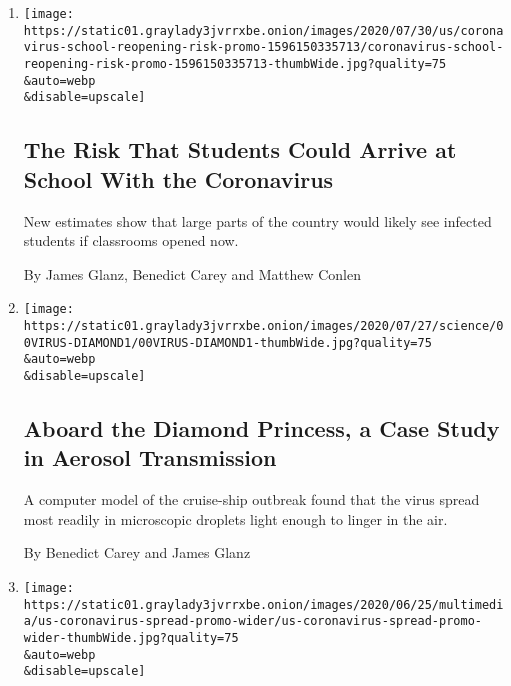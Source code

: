 \begin{enumerate}
\def\labelenumi{\arabic{enumi}.}
\item
  \href{/interactive/2020/07/31/us/coronavirus-school-reopening-risk.html}{}

  \texttt{[image: https://static01.graylady3jvrrxbe.onion/images/2020/07/30/us/coronavirus-school-reopening-risk-promo-1596150335713/coronavirus-school-reopening-risk-promo-1596150335713-thumbWide.jpg?quality=75\\\&auto=webp\\\&disable=upscale]}

  \hypertarget{the-risk-that-students-could-arrive-at-school-with-the-coronavirus}{%
  \subsection{The Risk That Students Could Arrive at School With the
  Coronavirus}\label{the-risk-that-students-could-arrive-at-school-with-the-coronavirus}}

  New estimates show that large parts of the country would likely see
  infected students if classrooms opened now.

  By James Glanz, Benedict Carey and Matthew Conlen
\item
  \href{/2020/07/30/health/diamond-princess-coronavirus-aerosol.html}{}

  \texttt{[image: https://static01.graylady3jvrrxbe.onion/images/2020/07/27/science/00VIRUS-DIAMOND1/00VIRUS-DIAMOND1-thumbWide.jpg?quality=75\\\&auto=webp\\\&disable=upscale]}

  \hypertarget{aboard-the-diamond-princess-a-case-study-in-aerosol-transmission}{%
  \subsection{Aboard the Diamond Princess, a Case Study in Aerosol
  Transmission}\label{aboard-the-diamond-princess-a-case-study-in-aerosol-transmission}}

  A computer model of the cruise-ship outbreak found that the virus
  spread most readily in microscopic droplets light enough to linger in
  the air.

  By Benedict Carey and James Glanz
\item
  \href{/interactive/2020/us/coronavirus-spread.html}{}

  \texttt{[image: https://static01.graylady3jvrrxbe.onion/images/2020/06/25/multimedia/us-coronavirus-spread-promo-wider/us-coronavirus-spread-promo-wider-thumbWide.jpg?quality=75\\\&auto=webp\\\&disable=upscale]}


\end{enumerate}

